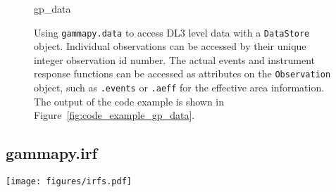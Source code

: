 \documentclass[longauth]{aa}
\newcommand{\code}[1]{\texttt{#1}}
\newcommand{\hess}{H.E.S.S.\xspace}
\newcommand{\hawc}{HAWC\xspace}
\newcommand{\magic}{MAGIC\xspace}
\newcommand{\cta}{CTA\xspace}
\newcommand{\fermi}{Fermi-LAT\xspace}
\begin{document}
\begin{figure}
        \small
        {gp_data}
        \caption{
        Using \code{gammapy.data} to access DL3 level data with a \code{DataStore} object.
        Individual observations can be accessed by their unique integer observation id number.
        The actual events and instrument response functions can be accessed
        as attributes on the \code{Observation} object, such as \code{.events}
        or \code{.aeff} for the effective area information. The output
                of the code example is shown in Figure~\ref{fig:code_example_gp_data}.
    }
        \label{fig*:minted:gp_data}
\end{figure}
%

\subsection{gammapy.irf}
\label{ssec:gammapy-irf}
%
%
\begin{figure*}[t]
        \centering
        \texttt{[image: figures/irfs.pdf]}
        \caption{
                Using \code{gammapy.irf} to read and plot instrument response functions.
                The left panel shows the effective area as a function of energy for
                the \cta, \hess, \magic, \hawc and \fermi instruments. The right panel shows
                the $68\%$ containment radius of the PSF as a function of energy for the \cta, \hess
                and \fermi instruments. The \cta IRFs are from the \enquote{prod5} production for the {\it alpha} configuration of the south and north array. The \hess IRFs are from the DL3 DR1,
        using observation ID 033787. The \magic effective area is computed for a
        $20\,{\rm min}$ observation at the Crab Nebula coordinates. The
                \fermi IRFs use \enquote{pass8} data and are also taken at the position of the Crab Nebula.
                The \hawc effective area is shown for the event classes $N_{Hit}=5 - 9$ as light gray
                lines along with the sum of all event classes as a black line. The \hawc IRFs are taken from
                the first public release of events data by the \hawc collaboration. All IRFs do not correspond
                to the latest performance of the instruments, but still are representative of the 
                detector type and energy range. We exclusively relied on publicly available
                data provided by the collaborations. The data is also available in the
                \code{gammapy-data} repository.
    }
        \label{fig:irfs}
\end{figure*}
%
\end{document}
